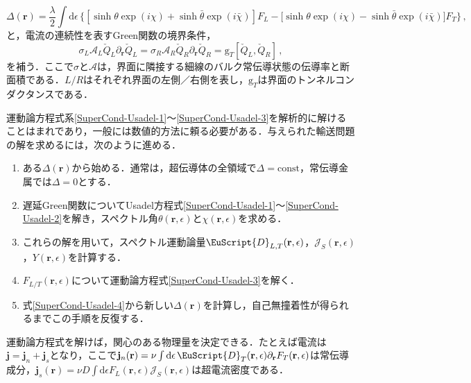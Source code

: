 \documentclass[a4paper,11pt]{ltjsarticle}
\def\d{\mathrm{d}}
\begin{document}
\begin{equation}\label{SuperCond-Usadel-4}
\Delta(\mathbf{r})=\frac{\lambda}{2}\int\d\epsilon\,\Big\{[\sinh\theta
\exp(i\chi)+\sinh\bar{\theta}\exp(i\bar{\chi})]F_{L}-\big[\sinh\theta
\exp(i\chi)-\sinh\bar{\theta}\exp(i\bar{\chi})\big]F_{T}\Big\}\,,
\end{equation}
と，電流の連続性を表すGreen関数の境界条件\cite{Nazarov-TunnelingAction,Zaitsev,KuprianovLukichev,Lambert}，
\begin{equation}\label{SuperCond-BoundaryConditions}
\sigma_{L}\mathcal{A}_{L}\check{Q}_{L}\partial_{\mathbf{r}}\check{Q}_{L}=
\sigma_{R}\mathcal{A}_{R}\check{Q}_{R}\partial_{\mathbf{r}}\check{Q}_{R}=
\mathrm{g}_{T}[\check{Q}_{L},\check{Q}_{R}]\,,
\end{equation}
を補う．ここで$\sigma$と$\mathcal{A}$は，界面に隣接する細線のバルク常伝導状態の伝導率と断面積である．$L/R$はそれぞれ界面の左側／右側を表し，$\mathrm{g}_{T}$は界面のトンネルコンダクタンスである．


運動論方程式系\eqref{SuperCond-Usadel-1}〜\eqref{SuperCond-Usadel-3}を解析的に解けることはまれであり，一般には数値的方法に頼る必要がある．与えられた輸送問題の解を求めるには，次のように進める\cite{BelzigWilhelm}．
\begin{enumerate}
\item ある$\Delta(\mathbf{r})$から始める．通常は，超伝導体の全領域で$\Delta=\mathrm{const}$，常伝導金属では$\Delta=0$とする．
\item 遅延Green関数についてUsadel方程式\eqref{SuperCond-Usadel-1}〜\eqref{SuperCond-Usadel-2}を解き，スペクトル角$\theta(\mathbf{r},\epsilon)$と$\chi(\mathbf{r},\epsilon)$を求める．
\item これらの解を用いて，スペクトル運動論量$\EuScript{D}_{L,T}(\mathbf{r},\epsilon)$，$\mathcal{J}_{S}(\mathbf{r},\epsilon)$，$Y(\mathbf{r},\epsilon)$を計算する．
\item $F_{L/T}(\mathbf{r},\epsilon)$について運動論方程式\eqref{SuperCond-Usadel-3}を解く．
\item 式\eqref{SuperCond-Usadel-4}から新しい$\Delta(\mathbf{r})$を計算し，自己無撞着性が得られるまでこの手順を反復する．
\end{enumerate}
運動論方程式を解けば，関心のある物理量を決定できる．たとえば電流は$\mathbf{j}=\mathbf{j}_{n}+\mathbf{j}_{s}$となり，ここで$\mathbf{j}_{n}(\mathbf{r})=\nu\int\d\epsilon\,\EuScript{D}_{T}(\mathbf{r},\epsilon)\partial_{\mathbf{r}} F_{T}(\mathbf{r},\epsilon)$は常伝導成分，$\mathbf{j}_{s}(\mathbf{r})=\nu D\int\d\epsilon F_{L}(\mathbf{r},\epsilon)\mathcal{J}_{S}(\mathbf{r},\epsilon)$は超電流密度である．
\end{document}
